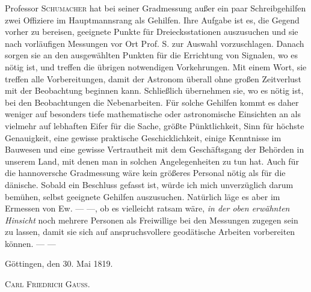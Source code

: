 Professor \textsc{Schumacher} hat bei seiner Gradmessung außer ein paar Schreibgehilfen zwei Offiziere im Hauptmannsrang als Gehilfen. Ihre Aufgabe ist es, die Gegend vorher zu bereisen, geeignete Punkte für Dreiecksstationen auszusuchen und sie nach vorläufigen Messungen vor Ort Prof. S. zur Auswahl vorzuschlagen. Danach sorgen sie an den ausgewählten Punkten für die Errichtung von Signalen, wo es nötig ist, und treffen die übrigen notwendigen Vorkehrungen. Mit einem Wort, sie treffen alle Vorbereitungen, damit der Astronom überall ohne großen Zeitverlust mit der Beobachtung beginnen kann. Schließlich übernehmen sie, wo es nötig ist, bei den Beobachtungen die Nebenarbeiten. Für solche Gehilfen kommt es daher weniger auf besonders tiefe mathematische oder astronomische Einsichten an als vielmehr auf lebhaften Eifer für die Sache, größte Pünktlichkeit, Sinn für höchste Genauigkeit, eine gewisse praktische Geschicklichkeit, einige Kenntnisse im Bauwesen und eine gewisse Vertrautheit mit dem Geschäftsgang der Behörden in unserem Land, mit denen man in solchen Angelegenheiten zu tun hat. Auch für die hannoversche Gradmessung wäre kein größeres Personal nötig als für die dänische. Sobald ein Beschluss gefasst ist, würde ich mich unverzüglich darum bemühen, selbst geeignete Gehilfen auszusuchen. Natürlich läge es aber im Ermessen von Ew. — —, ob es vielleicht ratsam wäre, \textit{in der oben erwähnten Hinsicht} noch mehrere Personen als Freiwillige bei den Messungen zugegen sein zu lassen, damit sie sich auf anspruchsvollere geodätische Arbeiten vorbereiten können. — —

Göttingen, den 30. Mai 1819.
\begin{flushright}\textsc{Carl Friedrich Gauss}.\end{flushright}
